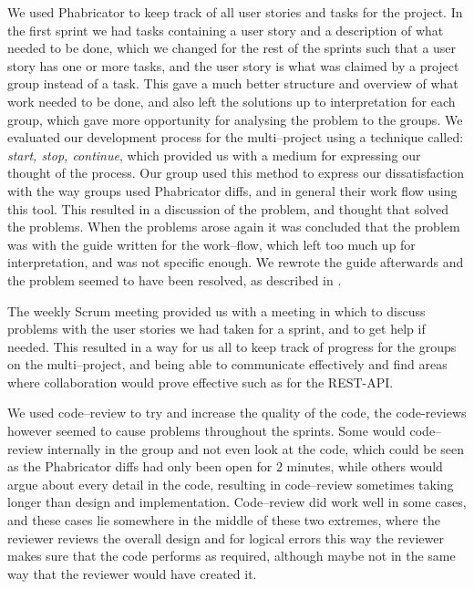 We used Phabricator to keep track of all user stories and tasks for the project.
In the first sprint we had tasks containing a user story and a description of what needed to be done, which we changed for the rest of the sprints such that a user story has one or more tasks, and the user story is what was claimed by a project group instead of a task.
This gave a much better structure and overview of what work needed to be done, and also left the solutions up to interpretation for each group, which gave more opportunity for analysing the problem to the groups.
We evaluated our development process for the multi--project using a technique called: \textit{start, stop, continue}, which provided us with a medium for expressing our thought of the process.
Our group used this method to express our dissatisfaction with the way groups used Phabricator diffs, and in general their work flow using this tool.
This resulted in a discussion of the problem, and thought that solved the problems.
When the problems arose again it was concluded that the problem was with the guide written for the work--flow, which left too much up for interpretation, and was not specific enough.
We rewrote the guide afterwards and the problem seemed to have been resolved, as described in .

The weekly Scrum meeting provided us with a meeting in which to discuss problems with the user stories we had taken for a sprint, and to get help if needed.
This resulted in a way for us all to keep track of progress for the groups on the multi--project, and being able to communicate effectively and find areas where collaboration would prove effective such as for the REST-API.

We used code--review to try and increase the quality of the code, the code-reviews however seemed to cause problems throughout the sprints.
Some would code--review internally in the group and not even look at the code, which could be seen as the Phabricator diffs had only been open for 2 minutes, while others would argue about every detail in the code, resulting in code--review sometimes taking longer than design and implementation.
Code--review did work well in some cases, and these cases lie somewhere in the middle of these two extremes, where the reviewer reviews the overall design and for logical errors this way the reviewer makes sure that the code performs as required, although maybe not in the same way that the reviewer would have created it.

